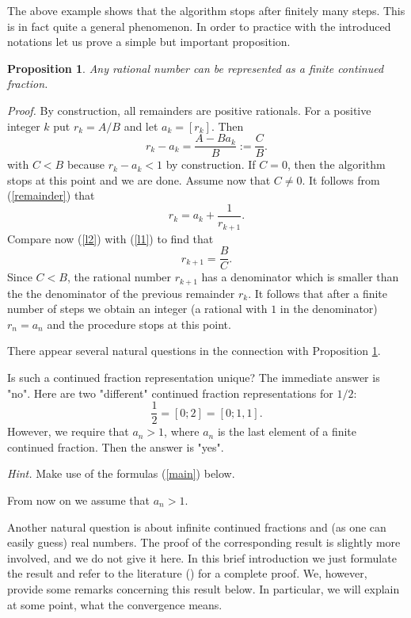 \documentclass[12pt,letterpaper]{book}
\newtheorem{prop}{Proposition}
\begin{document}
The above example shows that the algorithm stops after finitely many
steps. This is in fact quite a general phenomenon. In order to
practice with the introduced notations let us prove a simple but
important proposition. 
\begin{prop} \label{ratrep}
Any rational number can be represented as a finite continued
fraction.

\end{prop}
\par
{\sl Proof.} By construction, all remainders are positive rationals.
For a positive integer $k$ put $r_k=A/B$ and let $a_k=[r_k]$. Then
\begin{equation} \label{l2}
r_k-a_k = \frac{A-Ba_k}{B} := \frac{C}{B}.
\end{equation}
with $C<B$ because $r_k - a_k <1$ by construction. If $C=0$, then
the algorithm stops at this point and we are done. Assume now that
$C \neq 0$. It follows from (\ref{remainder}) that
\begin{equation} \label{l1}
r_k=a_k+\frac{1}{r_{k+1}}.
\end{equation}
Compare now (\ref{l2}) with (\ref{l1}) to find that
$$
r_{k+1} = \frac{B}{C}.
$$
Since $C<B$, the rational number $r_{k+1}$ has a denominator which
is smaller than the the denominator of the previous remainder $r_k$.
It follows that after a finite number of steps we obtain an integer
(a rational with $1$ in the denominator) $r_n=a_n$ and the procedure
stops at this point.

There appear several natural questions in the connection with
Proposition \ref{ratrep}.

Is such a continued fraction representation unique? The immediate
answer is "no". Here are two "different" continued fraction
representations for $1/2$:
$$
\frac{1}{2}=[0;2]=[0;1,1].
$$
However, we require that $a_n>1$, where $a_n$  is the last element
of a finite continued fraction. Then the answer is "yes".


{\sl Hint.} Make use of the formulas (\ref{main}) below.

From now on we assume that $a_n>1$.

Another natural question is about infinite continued fractions and
(as one can easily guess) real numbers. The proof of the
corresponding result is slightly more involved, and we do not give
it here. In this brief introduction we just formulate the result and
refer to the literature (\cite[Theorem 14]{Khinchin}) for a complete
proof. We, however, provide some remarks concerning this result
below. In particular, we will explain at some point, what the
convergence means.
\end{document}
